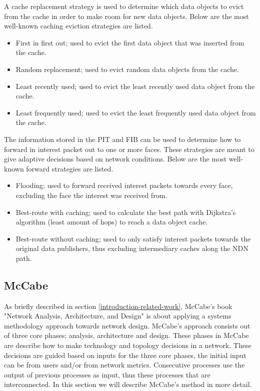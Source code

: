 A cache replacement strategy is used to determine which data objects to evict from the cache in order to make room for new data objects. Below are the most well-known caching eviction strategies are listed.
\begin{itemize}
    \item First in first out; used to evict the first data object that was inserted from the cache.
    \item Random replacement; used to evict random data objects from the cache.
    \item Least recently used; used to evict the least recently used data object from the cache.
    \item Least frequently used; used to evict the least frequently used data object from the cache.
\end{itemize}

The information stored in the PIT and FIB can be used to determine how to forward in interest packet out to one or more faces. These strategies are meant to give adaptive decisions based on network conditions. Below are the most well-known forward strategies are listed.
\begin{itemize}
    \item Flooding; used to forward received interest packets towards every face, excluding the face the interest was received from.
    \item Best-route with caching; used to calculate the best path with Dijkstra's algorithm (least amount of hops) to reach a data object cache.
    \item Best-route without caching; used to only satisfy interest packets towards the original data publishers, thus excluding intermediary caches along the NDN path. 
\end{itemize}

\subsection{McCabe}
\label{overview-mccabe}
As briefly described in section \ref{introduction-related-work}, McCabe's book "Network Analysis, Architecture, and Design" \cite{mccabe2010network} is about applying a systems methodology approach towards network design. McCabe's approach consists out of three core phases; analysis, architecture and design. These phases in McCabe are describe how to make technology and topology decisions in a network. These decisions are guided based on inputs for the three core phases, the initial input can be from users and/or from network metrics. Consecutive processes use the output of previous processes as input, thus these processes that are interconnected. In this section we will describe McCabe's method in more detail.

